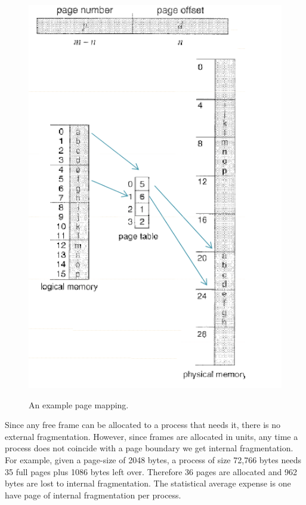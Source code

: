\documentclass[10pt,a4paper]{article}
\begin{document}
\begin{figure}
\caption{An example page mapping. \cite{OSCONCEPTS}}
\begin{center}
\includegraphics[scale=0.45]{../images/page-mapping.png}
\label{page mapping}
\end{center}
\end{figure}
Since any free frame can be allocated to a process that needs it, there is no external fragmentation. However, since frames are allocated in units, any time a process does not coincide with a page boundary we get internal fragmentation. For example, given a page-size of 2048 bytes, a process of size 72,766 bytes needs 35 full pages plus 1086 bytes left over. Therefore 36 pages are allocated and 962 bytes are lost to internal fragmentation. The statistical average expense is one have page of internal fragmentation per process. 
\newline\newline
\end{document}
